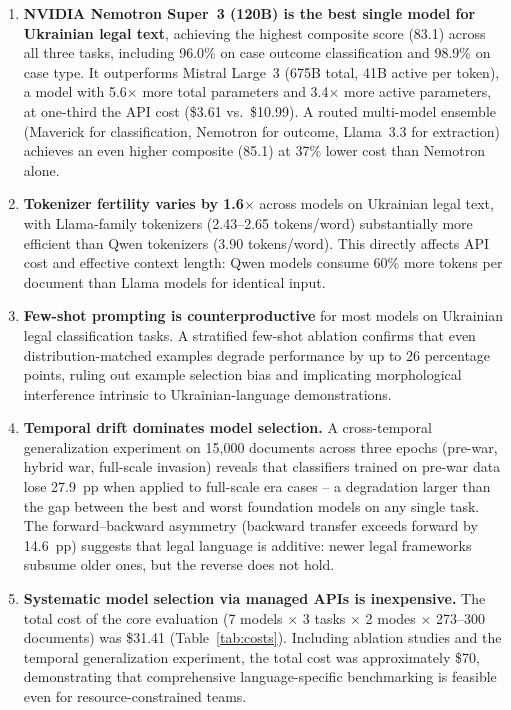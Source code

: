 \documentclass[11pt,a4paper]{article}
\begin{document}
\begin{enumerate}[leftmargin=*]
    \item \textbf{NVIDIA Nemotron Super~3 (120B) is the best single model for Ukrainian legal text}, achieving the highest composite score (83.1) across all three tasks, including 96.0\% on case outcome classification and 98.9\% on case type. It outperforms Mistral Large~3 (675B total, 41B active per token), a model with 5.6$\times$ more total parameters and 3.4$\times$ more active parameters, at one-third the API cost (\$3.61 vs.\ \$10.99). A routed multi-model ensemble (Maverick for classification, Nemotron for outcome, Llama~3.3 for extraction) achieves an even higher composite (85.1) at 37\% lower cost than Nemotron alone.

    \item \textbf{Tokenizer fertility varies by 1.6$\times$} across models on Ukrainian legal text, with Llama-family tokenizers (2.43--2.65 tokens/word) substantially more efficient than Qwen tokenizers (3.90 tokens/word). This directly affects API cost and effective context length: Qwen models consume 60\% more tokens per document than Llama models for identical input.

    \item \textbf{Few-shot prompting is counterproductive} for most models on Ukrainian legal classification tasks. A stratified few-shot ablation confirms that even distribution-matched examples degrade performance by up to 26 percentage points, ruling out example selection bias and implicating morphological interference intrinsic to Ukrainian-language demonstrations.

    \item \textbf{Temporal drift dominates model selection.} A cross-temporal generalization experiment on 15{,}000 documents across three epochs (pre-war, hybrid war, full-scale invasion) reveals that classifiers trained on pre-war data lose 27.9~pp when applied to full-scale era cases -- a degradation larger than the gap between the best and worst foundation models on any single task. The forward--backward asymmetry (backward transfer exceeds forward by 14.6~pp) suggests that legal language is additive: newer legal frameworks subsume older ones, but the reverse does not hold.

    \item \textbf{Systematic model selection via managed APIs is inexpensive.} The total cost of the core evaluation (7 models $\times$ 3 tasks $\times$ 2 modes $\times$ 273--300 documents) was \$31.41 (Table~\ref{tab:costs}). Including ablation studies and the temporal generalization experiment, the total cost was approximately \$70, demonstrating that comprehensive language-specific benchmarking is feasible even for resource-constrained teams.
\end{enumerate}
\end{document}
